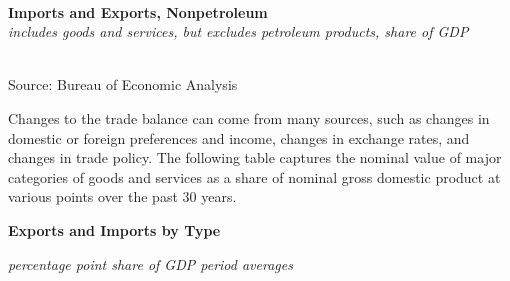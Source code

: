 \documentclass{report}
\makeatletter
\newcommand{\tbllink}[1]{\href{https://raw.githubusercontent.com/bdecon/US-chartbook/master/chartbook/data/#1}{\faTable}}
\newcommand*\short[1]{\expandafter\@gobbletwo\number\numexpr#1\relax}
\newcommand{\dateaxisticks}{
		date coordinates in=x, axis line style={draw=none},
		xmax={2020-05-10},
		max space between ticks=40,	    
		xtick={{1990-01-01}, {1992-01-01}, {1994-01-01}, 
			{1996-01-01}, {1998-01-01}, {2000-01-01}, 
			{2002-01-01}, {2004-01-01}, {2006-01-01},
			{2008-01-01}, {2010-01-01}, {2012-01-01}, {2014-01-01},
		    {2016-01-01}, {2018-01-01}, {2020-01-01}},
		minor xtick={{1989-01-01}, {1991-01-01}, {1993-01-01},
			{1995-01-01}, {1997-01-01}, {1999-01-01}, 
			{2001-01-01}, {2003-01-01}, {2005-01-01}, {2007-01-01},
		    {2009-01-01}, {2011-01-01}, {2013-01-01}, {2015-01-01},
		    {2017-01-01}, {2019-01-01}},
		enlarge y limits={0.06}, enlarge x limits={0.01},
		}
\newcommand{\bbar}[2]{extra #1 ticks = {{#2}}, extra #1 tick labels = ,
		extra #1 tick style = {grid=major, grid style={thick, black!25}},}
\newcommand{\thickline}[4]{\addplot[ultra thick, no markers, color=#1] 
		table [x=#2, y=#3, col sep=comma] {#4};	}
\newcommand{\rbars}{
		\fill[color=black!10] (axis cs:{1990-07-01},\pgfkeysvalueof{/pgfplots/ymin}) rectangle 
			(axis cs:{1991-03-01}, \pgfkeysvalueof{/pgfplots/ymax});
		\fill[color=black!10] (axis cs:{2007-12-01},\pgfkeysvalueof{/pgfplots/ymin}) rectangle 
			(axis cs:{2009-07-01}, \pgfkeysvalueof{/pgfplots/ymax});
		\fill[color=black!10] (axis cs:{2001-03-01},\pgfkeysvalueof{/pgfplots/ymin}) rectangle 
			(axis cs:{2001-11-01}, \pgfkeysvalueof{/pgfplots/ymax});}
\makeatother
\begin{document}
{{{{{{{\begin{minipage}{0.76\textwidth}
\small \\

\vspace{2mm}


\noindent \normalsize \textbf{Imports and Exports, Nonpetroleum}\\
\footnotesize{\textit{includes goods and services, but excludes petroleum products, share of GDP}}\\
\noindent \hspace*{-2mm} \\
\footnotesize{Source: Bureau of Economic Analysis} \hfill \tbllink{eximgdp.csv}


\end{minipage}

\newpage


\begin{minipage}{0.76\textwidth}

\small Changes to the trade balance can come from many sources, such as changes in domestic or foreign preferences and income, changes in exchange rates, and changes in trade policy. The following table captures the nominal value of major categories of goods and services as a share of nominal gross domestic product at various points over the past 30 years.  \\

\end{minipage}

\noindent \normalsize \textbf{Exports and Imports by Type}\\
\footnotesize{\textit{percentage point share of GDP \hspace{40mm} period averages}\\ 
\noindent {} \setlength{\tabcolsep}{3.1pt} \color{black!90}
		{\renewcommand{\arraystretch}{1.55}
		 \begin{tabular}{p{42mm} R{7.1mm} R{7.1mm} R{7.1mm} R{7.1mm} R{7.1mm} 
		   R{7.1mm} R{7.1mm} R{7.1mm} }
			 \hline
		\end{tabular}}	\\
		
}}}}}}}}
\end{document}
